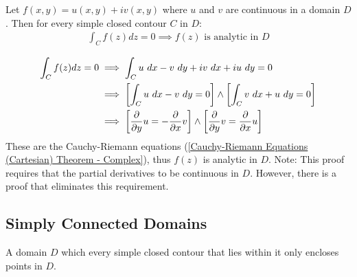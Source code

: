 \documentclass[12pt, english]{book}
\makeatletter
\renewenvironment{proof}[1][\proofname]{\par
	\pushQED{\qed}%
	\normalfont \topsep6\p@\@plus6\p@\relax
	\list{}{%
		\settowidth{\leftmargin}{\itshape\proofname:\hskip\labelsep}%
		\setlength{\labelwidth}{0pt}%
		\setlength{\itemindent}{-\leftmargin}%
		}%
	\item[\hskip\labelsep\itshape#1\@addpunct{:}]\ignorespaces
	}{\popQED\endlist\@endpefalse}
\makeatother
\begin{document}
	\begin{theorem}
		\label{Morera's Theorem - Complex}
		Let \(f(x,y) = u(x,y) + iv(x,y)\) where \(u\) and \(v\) are continuous in a domain \(D\). Then for every simple closed contour \(C\) in \(D\):
		\begin{align*}
			\int_{C} f(z) dz = 0 \implies f(z) \text{ is analytic in } D
		\end{align*}
	\end{theorem}
	\begin{proof}
		{\color{Grey}
		\begin{align*}
			\int_{C} f(z) dz = 0 
			&\implies \int_{C} u \ dx - v \ dy + iv \ dx + iu \ dy = 0 \\
			&\implies \left[\int_{C} u \ dx - v \ dy = 0 \right] \land 
						\left[ \int_{C} v \ dx + u \ dy = 0 \right] \\
			&\implies \left[ \pdv{y}u = - \pdv{x} v \right] \land \left[ \pdv{y}v = \pdv{x} u \right]
		\end{align*}
		These are the Cauchy-Riemann equations (\cref{Cauchy-Riemann Equations (Cartesian) Theorem - Complex}), thus \(f(z)\) is analytic in \(D\).
		}
	\end{proof}
	Note: This proof requires that the partial derivatives to be continuous in \(D\). However, there is a proof that eliminates this requirement.

	\subsection{Simply Connected Domains} \label{Simply Connected Domains Subsection - Complex}
	
	\begin{definition}
		\label{Simply Connected (Domain) Definition - Complex}
		A domain \(D\) which every simple closed contour that lies within it only encloses points in \(D\).
	\end{definition}
\end{document}
